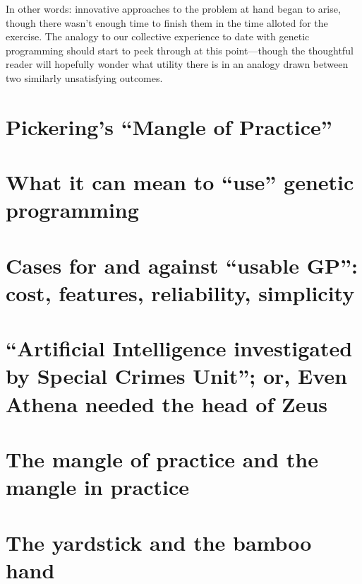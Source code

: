 In other words: innovative approaches to the problem at hand began to arise, though there wasn't enough time to finish them in the time alloted for the exercise. The analogy to our collective experience to date with genetic programming should start to peek through at this point---though the thoughtful reader will hopefully wonder what utility there is in an analogy drawn between two similarly unsatisfying outcomes.

\section{Pickering's ``Mangle of Practice''}\hypertarget{pickerings-mangle-of-practice}{}\label{pickerings-mangle-of-practice}

\section{What it can mean to ``use'' genetic programming}\hypertarget{what-it-can-mean-to-use-genetic-programming}{}\label{what-it-can-mean-to-use-genetic-programming}

\section{Cases for and against ``usable GP'': cost, features, reliability, simplicity}\hypertarget{cases-for-and-against-usable-gp-cost-features-reliability-simplicity}{}\label{cases-for-and-against-usable-gp-cost-features-reliability-simplicity}

\section{``Artificial Intelligence investigated by Special Crimes Unit''; or, Even Athena needed the head of Zeus}\hypertarget{artificial-intelligence-investigated-by-special-crimes-unit-or-even-athena-needed-the-head-of-zeus}{}\label{artificial-intelligence-investigated-by-special-crimes-unit-or-even-athena-needed-the-head-of-zeus}

\section{The mangle of practice and the mangle in practice}\hypertarget{the-mangle-of-practice-and-the-mangle-in-practice}{}\label{the-mangle-of-practice-and-the-mangle-in-practice}

\section{The yardstick and the bamboo hand}\hypertarget{the-yardstick-and-the-bamboo-hand}{}\label{the-yardstick-and-the-bamboo-hand}

